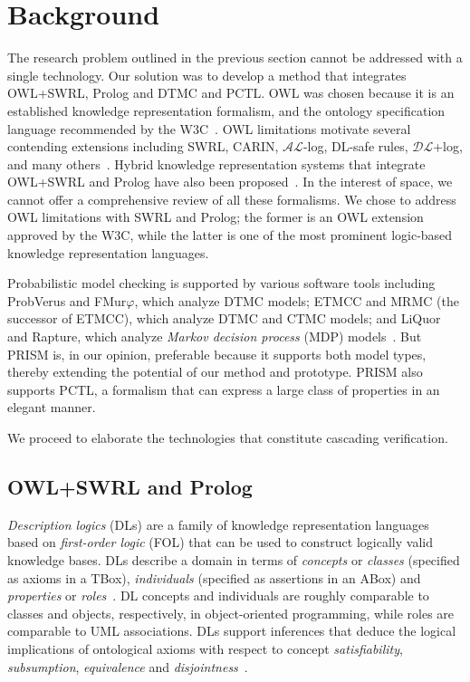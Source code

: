 \section{Background}
\label{sec:Background}

\noindent The research problem outlined in the previous section cannot be addressed with a single technology. Our solution was to develop a method that integrates OWL+SWRL, Prolog and DTMC and PCTL\@. OWL was chosen because it is an established knowledge representation formalism, and the ontology specification language recommended by the W3C~\cite{Horrocks_2011}. OWL limitations motivate several contending extensions including SWRL, CARIN, $\mathcal{AL}$-log, DL-safe rules, $\mathcal{DL}$+log, and many others~\cite{Motik_2006}. Hybrid knowledge representation systems that integrate OWL+SWRL and Prolog have also been proposed~\cite{Sensoy_2011,Matzner_2007,Papadakis_2011,Samuel_2008,Lukacsy_2009a,Almendros_Jimenez_2011,Elenius_2012}. In the interest of space, we cannot offer a comprehensive review of all these formalisms. We chose to address OWL limitations with SWRL and Prolog; the former is an OWL extension approved by the W3C, while the latter is one of the most prominent logic-based knowledge representation languages.

Probabilistic model checking is supported by various software tools including ProbVerus and FMur$\varphi$, which analyze DTMC models; ETMCC and MRMC (the successor of ETMCC), which analyze DTMC and CTMC models; and LiQuor and Rapture, which analyze \emph{Markov decision process} (MDP) models~\cite{Baier_2008}. But PRISM is, in our opinion, preferable because it supports both model types, thereby extending the potential of our method and prototype. PRISM also supports PCTL, a formalism that can express a large class of properties in an elegant manner.

We proceed to elaborate the technologies that constitute cascading verification.

\subsection{OWL+SWRL and Prolog}

\noindent \emph{Description logics} (DLs) are a family of knowledge representation languages based on \emph{first-order logic} (FOL) that can be used to construct logically valid knowledge bases. DLs describe a domain in terms of \emph{concepts} or \emph{classes} (specified as axioms in a TBox), \emph{individuals} (specified as assertions in an ABox) and \emph{properties} or \emph{roles}~\cite{Horrocks_2011}. DL concepts and individuals are roughly comparable to classes and objects, respectively, in object-oriented programming, while roles are comparable to UML associations. DLs support inferences that deduce the logical implications of ontological axioms with respect to concept \emph{satisfiability}, \emph{subsumption}, \emph{equivalence} and \emph{disjointness}~\cite{Baader_2005}.

